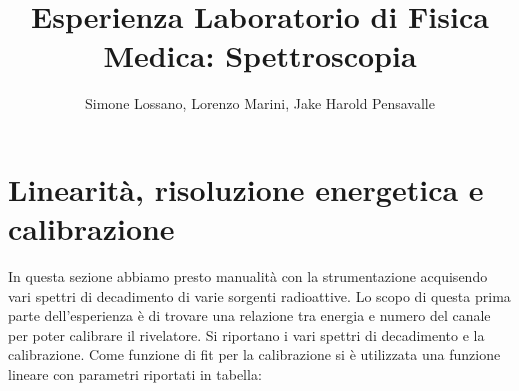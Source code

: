 \documentclass[a4paper]{article}
\title{Esperienza Laboratorio di Fisica Medica: Spettroscopia}
\author{Simone Lossano, Lorenzo Marini, Jake Harold Pensavalle}
\begin{document}
	\maketitle
	\newpage
	\tableofcontents
	\newpage
\section{Linearità, risoluzione energetica e calibrazione}
In questa sezione abbiamo presto manualità con la strumentazione acquisendo vari spettri di decadimento di varie sorgenti radioattive. Lo scopo di questa prima parte dell'esperienza è di trovare una relazione tra energia e numero del canale per poter calibrare il rivelatore. 
Si riportano i vari spettri di decadimento e la calibrazione. Come funzione di fit per la calibrazione si è utilizzata una funzione lineare con parametri riportati in tabella:
\end{document}
